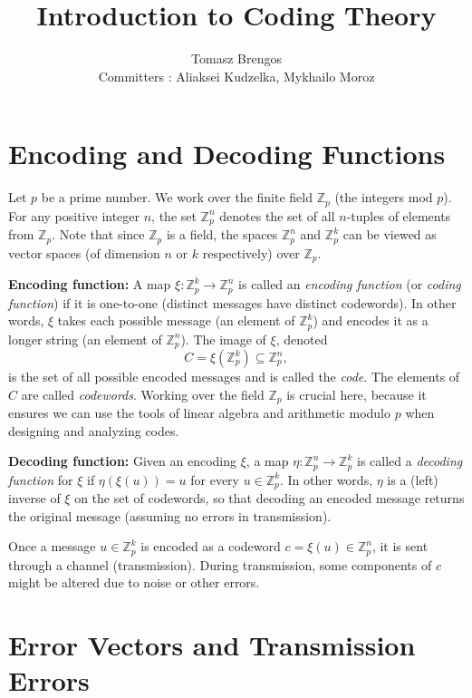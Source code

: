 \documentclass[docmute]{article}
\title{Introduction to Coding Theory}
\author{Tomasz Brengos \\  
Committers : Aliaksei Kudzelka, Mykhailo Moroz}
\date{}
\begin{document}
\maketitle


\section{Encoding and Decoding Functions}

Let $p$ be a prime number. We work over the finite field $\mathbb{Z}_p$ (the integers mod $p$). For any positive integer $n$, the set $\mathbb{Z}_p^n$ denotes the set of all $n$-tuples of elements from $\mathbb{Z}_p$. Note that since $\mathbb{Z}_p$ is a field, the spaces $\mathbb{Z}_p^n$ and $\mathbb{Z}_p^k$ can be viewed as vector spaces (of dimension $n$ or $k$ respectively) over $\mathbb{Z}_p$.

\medskip

\noindent \textbf{Encoding function:} A map $\xi: \mathbb{Z}_p^k \to \mathbb{Z}_p^n$ is called an \emph{encoding function} (or \emph{coding function}) if it is one-to-one (distinct messages have distinct codewords). In other words, $\xi$ takes each possible message (an element of $\mathbb{Z}_p^k$) and encodes it as a longer string (an element of $\mathbb{Z}_p^n$). The image of $\xi$, denoted 
\[ C = \xi(\mathbb{Z}_p^k) \subseteq \mathbb{Z}_p^n, \] 
is the set of all possible encoded messages and is called the \emph{code}. The elements of $C$ are called \emph{codewords}. Working over the field $\mathbb{Z}_p$ is crucial here, because it ensures we can use the tools of linear algebra and arithmetic modulo $p$ when designing and analyzing codes.

\medskip

\noindent \textbf{Decoding function:} Given an encoding $\xi$, a map $\eta: \mathbb{Z}_p^n \to \mathbb{Z}_p^k$ is called a \emph{decoding function} for $\xi$ if $\eta(\xi(u)) = u$ for every $u \in \mathbb{Z}_p^k$. In other words, $\eta$ is a (left) inverse of $\xi$ on the set of codewords, so that decoding an encoded message returns the original message (assuming no errors in transmission).

\medskip

Once a message $u \in \mathbb{Z}_p^k$ is encoded as a codeword $c = \xi(u) \in \mathbb{Z}_p^n$, it is sent through a channel (transmission). During transmission, some components of $c$ might be altered due to noise or other errors.

\section{Error Vectors and Transmission Errors}
\end{document}
